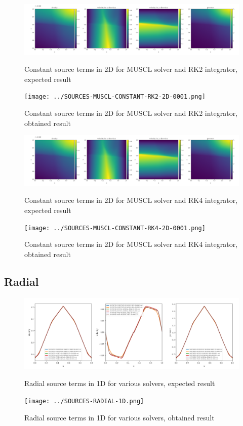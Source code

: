     \begin{figure}[htbp]
        \centering
        \includegraphics[width=.9\textwidth]{./figures/SOURCES-MUSCL-CONSTANT-RK2-2D-0001.png}%
        \caption{Constant source terms in 2D for MUSCL solver and RK2 integrator, expected result}
        \texttt{[image: ../SOURCES-MUSCL-CONSTANT-RK2-2D-0001.png]}%
        \caption{Constant source terms in 2D for MUSCL solver and RK2 integrator, obtained result}
    \end{figure}

    \begin{figure}[htbp]
        \centering
        \includegraphics[width=.9\textwidth]{./figures/SOURCES-MUSCL-CONSTANT-RK4-2D-0001.png}%
        \caption{Constant source terms in 2D for MUSCL solver and RK4 integrator, expected result}
        \texttt{[image: ../SOURCES-MUSCL-CONSTANT-RK4-2D-0001.png]}%
        \caption{Constant source terms in 2D for MUSCL solver and RK4 integrator, obtained result}
    \end{figure}






\clearpage
\subsection{Radial}




    \begin{figure}[htbp]
        \centering
        \includegraphics[width=.9\textwidth]{./figures/SOURCES-RADIAL-1D.png}%
        \caption{Radial source terms in 1D for various solvers, expected result}
        \texttt{[image: ../SOURCES-RADIAL-1D.png]}%
        \caption{Radial source terms in 1D for various solvers, obtained result}
    \end{figure}



